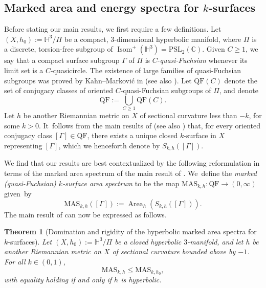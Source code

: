 \documentclass[JEP,XML,SOM,Unicode,NoEqCountersInSection,published]{cedram}
\newcommand{\ksurface}{$k$\nobreakdash-surface\xspace}
\newcommand{\ksurfaces}{$k$\nobreakdash-surfaces\xspace}
\theoremstyle{plain}
\newtheorem{theorem}{Theorem}[section]
\theoremstyle{definition}
\newcommand\PSLc{\mathrm{PSL}_2(\mathbb{C})}
\newcommand\Hyp{\mathbb{H}^3}
\newcommand{\QF}{\mathrm{QF}}
\DeclareMathOperator{\Isom}{Isom}
\DeclareMathOperator{\Area}{Area}
\begin{document}
\subsection{Marked area and energy spectra for \ksurfaces}

Before stating our main results, we first require a few definitions. Let $(X,h_0):=\Hyp/\Pi$ be a compact, $3$\nobreakdash-dimensional hyperbolic manifold, where $\Pi$ is a discrete, torsion-free subgroup of $\Isom^+(\Hyp)=\PSLc$. Given $C\geq 1$, we say that a compact surface subgroup $\Gamma$ of $\Pi$ is $C$-\emph{quasi-Fuchsian} whenever its limit set is a $C$-quasicircle. The existence of large families of quasi-Fuchsian subgroups was proved by Kahn--Markovi\'c in \cite{KM1,KM2} (see also \cite{HamenstadtKM,Kahn_Labourie_Mozes}). Let $\QF(C)$ denote the set of conjugacy classes of oriented $C$-quasi-Fuchsian subgroups of $\Pi$, and denote
\begin{equation*}
\QF:=\bigcup_{C\geq 1}\QF(C).
\end{equation*}
Let $h$ be another Riemannian metric on $X$ of sectional curvature less than $-k$, for some $k>0$. It~follows from the main results of \cite{LabourieInvent} (see also \cite{Smith_asymp}) that, for every oriented conjugacy class $[\Gamma]\in\QF$, there exists a unique closed \ksurface in $X$ representing $[\Gamma]$, which we henceforth denote by $S_{k,h}([\Gamma])$.

We find that our results are best contextualized by the following reformulation in terms of the marked area spectrum of the main result of \cite{ALS}. We~define the \emph{marked (quasi-Fuchsian) \ksurface area spectrum} to be the map $\text{MAS}_{k,h}:\QF\to(0,\infty)$ given~by
\begin{equation*}
\text{MAS}_{k,h}([\Gamma]) := \Area_h(S_{k,h}([\Gamma])).
\end{equation*}
The main result of \cite{ALS} can now be expressed as follows.

\begin{theorem}[Domination and rigidity of the hyperbolic marked area spectra for \ksurfaces]\label{th.rigidity_area}
Let $(X,h_0):=\Hyp/\Pi$ be a closed hyperbolic $3$\nobreakdash-manifold, and let $h$ be another Riemannian metric on $X$ of sectional curvature bounded above by $-1$. For all $k\in(0,1)$,
\begin{equation}\label{eqn.rigidity_area}
\mathrm{MAS}_{k,h}\leq\mathrm{MAS}_{k,h_0},
\end{equation}
with equality holding if and only if $h$ is hyperbolic.
\end{theorem}
\end{document}

